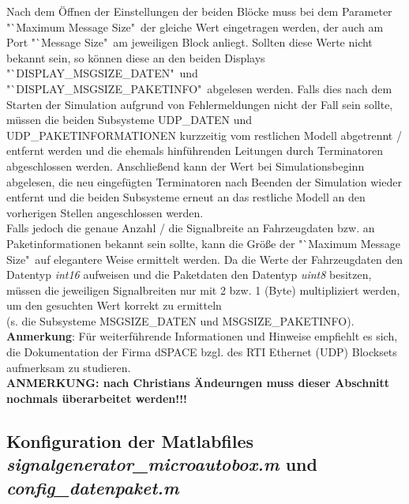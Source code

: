 \documentclass[fontsize = 12pt, paper = a4]{scrreprt}
\begin{document}
Nach dem Öffnen der Einstellungen der beiden Blöcke muss bei dem Parameter "`Maximum Message Size"\ der gleiche Wert eingetragen werden, der auch am Port "`Message Size"\ am jeweiligen Block anliegt. Sollten diese Werte nicht bekannt sein, so können diese an den beiden Displays "`DISPLAY\_MSGSIZE\_DATEN"\ und "`DISPLAY\_MSGSIZE\_PAKETINFO"\ abgelesen werden. Falls dies nach dem Starten der Simulation aufgrund von Fehlermeldungen nicht der Fall sein sollte, müssen die beiden Subsysteme UDP\_DATEN und UDP\_PAKETINFORMATIONEN kurzzeitig vom restlichen Modell abgetrennt / entfernt werden und die ehemals hinführenden Leitungen durch Terminatoren abgeschlossen werden. Anschließend kann der Wert bei Simulationsbeginn abgelesen, die neu eingefügten Terminatoren nach Beenden der Simulation wieder entfernt und die beiden Subsysteme erneut an das restliche Modell an den vorherigen Stellen angeschlossen werden. \\ 

Falls jedoch die genaue Anzahl / die Signalbreite an Fahrzeugdaten bzw. an Paketinformationen bekannt sein sollte, kann die Größe der "`Maximum Message Size"\ auf elegantere Weise ermittelt werden. Da die Werte der Fahrzeugdaten den Datentyp \textit{int16} aufweisen und die Paketdaten den Datentyp \textit{uint8} besitzen, müssen die jeweiligen Signalbreiten nur mit 2 bzw. 1 (Byte) multipliziert werden, um den gesuchten Wert korrekt zu ermitteln \\ (s. die Subsysteme MSGSIZE\_DATEN und MSGSIZE\_PAKETINFO). \\  

\textbf{Anmerkung}: Für weiterführende Informationen und Hinweise empfiehlt es sich, die Dokumentation der Firma dSPACE bzgl. des RTI Ethernet (UDP) Blocksets aufmerksam zu studieren. \\

\textbf{ANMERKUNG: nach Christians Ändeurngen muss dieser Abschnitt nochmals überarbeitet werden!!!}



\newpage





\subsection{Konfiguration der Matlabfiles \textit{signalgenerator\_microautobox.m} und \textit{config\_datenpaket.m}}
\end{document}
